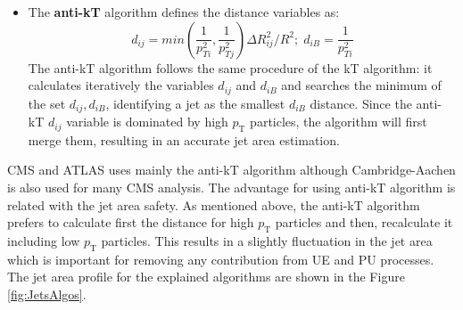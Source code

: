 \begin{itemize}
 \item The \textbf{anti-kT} algorithm \cite{AntiKTAlgorithm} defines the distance variables as:
 \begin{equation}
  \label{eq:antikt}
  d_{ij}=min\left(\frac{1}{p_{Ti}^{2}},\frac{1}{p_{Tj}^{2}}\right)\Delta R_{ij}^{2}/R^{2};\; d_{iB}=\frac{1}{p_{Ti}^{2}}
 \end{equation} 
 The anti-kT algorithm follows the same procedure of the kT algorithm: it calculates iteratively the variables $d_{ij}$ and $d_{iB}$
 and searches the minimum of the set ${d_{ij},d_{iB}}$, identifying a jet as the smallest $d_{iB}$ distance. Since 
 the anti-kT $d_{ij}$  variable is dominated by high $p_{\textrm{T}}$ particles, the algorithm will first merge them, resulting in an
 accurate jet area estimation. 
\end{itemize}

CMS and ATLAS uses mainly the anti-kT algorithm although Cambridge-Aachen is also used for many CMS analysis. The advantage for using 
anti-kT algorithm is related with the jet area safety. As mentioned above, the anti-kT algorithm prefers to calculate first the distance
for high $p_{\textrm{T}}$ particles and then, recalculate it including low $p_{\textrm{T}}$ particles. This results in a slightly 
fluctuation in the jet area which is important for removing any contribution from UE and PU processes. The jet area profile for the
explained algorithms are shown in the Figure \ref{fig:JetsAlgos}. \\

